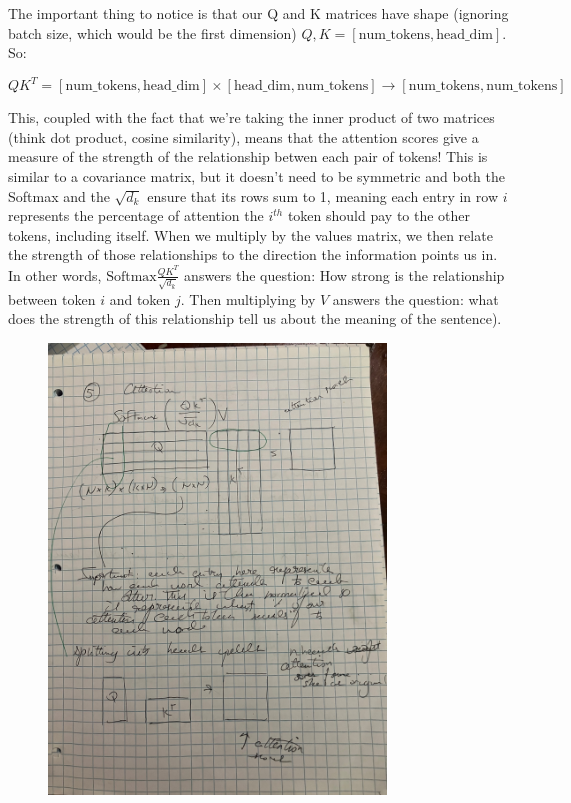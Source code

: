 \documentclass[12pt]{article}
\begin{document}
\begin{enumerate}
The important thing to notice is that our Q and K matrices have shape (ignoring batch size, which would be the first dimension) \(Q, K = [\text{num\_tokens}, \text{head\_dim}]\). So:

\[
QK^T = [\text{num\_tokens}, \text{head\_dim}] \times [\text{head\_dim}, \text{num\_tokens}] \rightarrow [\text{num\_tokens}, \text{num\_tokens}]
\]


This, coupled with the fact that we're taking the inner product of two matrices (think dot product, cosine similarity), means that the attention scores give a measure of the strength of the relationship betwen each pair of tokens! This is similar to a covariance matrix, but it doesn't need to be symmetric and both the Softmax and the \(\sqrt{d_k}\) ensure that its rows sum to 1, meaning each entry in row \(i\) represents the percentage of attention the \(i^{th}\) token should pay to the other tokens, including itself. When we multiply by the values matrix, we then relate the strength of those relationships to the direction the information points us in. In other words, \(\text{Softmax}\frac{QK^T}{\sqrt{d_k}}\) answers the question: How strong is the relationship between token \(i\) and token \(j\). Then multiplying by \(V\) answers the question: what does the strength of this relationship tell us about the meaning of the sentence). 

\begin{figure}[H]
    \centering
    \includegraphics[width=0.8\textwidth, angle=270]{./attention_scores_calculation.jpg}
\end{figure}


\end{enumerate}
\end{document}
